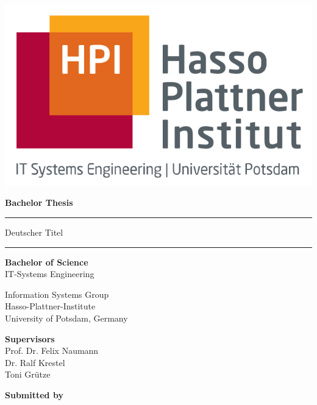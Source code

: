 \begin{titlepage}
  \begin{center} 	
	
	\includegraphics[scale=.3]{images/HPI.png}
		
	\vspace{1cm}
		
	{\Large\bfseries Bachelor Thesis \par}
		
	\vspace{0.5cm}
    
	\rule{\textwidth}{0.4pt}
    {\LARGE\bfseries{\thetitle} \par}
    
    \vspace{0.5cm}
                
    {\large\bfseries{Deutscher Titel \par}}
		\rule{\textwidth}{0.4pt}

        
    \vspace{1cm}

    {\large\bfseries{Bachelor of Science}} \\
    IT-Systems Engineering
    \vspace{0.3cm}
    
    Information Systems Group \\
    Hasso-Plattner-Institute \\
    University of Potsdam, Germany
    
    \vspace{1.3cm}
   	
	\textbf{Supervisors}\\ 
	Prof. Dr. Felix Naumann\\
	Dr. Ralf Krestel\\
    Toni Grütze
 
    \vspace{0.8cm}

		\textbf{Submitted by}\\
		\theauthor
			
    \vspace{0.8cm}
		
    \usvardate{}
  \end{center}
\end{titlepage}

